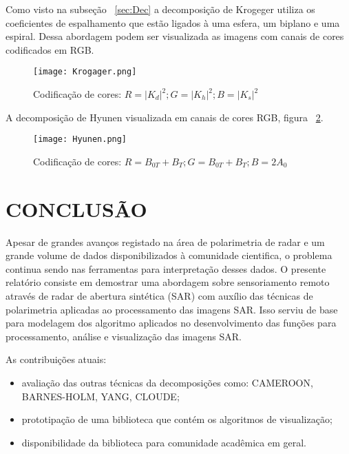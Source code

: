 \documentclass[a4paper,12pt]{article}
\begin{document}
Como visto na subseção ~\ref{sec:Dec} a decomposição de Krogeger utiliza os coeficientes de espalhamento que estão ligados à uma esfera, um biplano e uma espiral. Dessa abordagem podem ser visualizada as imagens com canais de cores codificados em RGB.

\begin{figure}[H]
	\centering
	\texttt{[image: Krogager.png]}
	\caption{Codificação de cores: $R=|K_{d}|^2; G=|K_{h}|^2; B=|K_{s}|^2$}
	\label{fig:Krogager}
\end{figure}

\newpage

A decomposição de Hyunen visualizada em canais de cores RGB, figura ~\ref{fig:Hyunen}.

\begin{figure}[H]
	\centering
	\texttt{[image: Hyunen.png]}
	\caption{Codificação de cores: $R=B_{0T}+B_{T}; G=B_{0T}+B_{T}; B=2A_{0}$}
	\label{fig:Hyunen}
\end{figure}

\newpage
\section{CONCLUSÃO}

Apesar de grandes avanços registado na área de polarimetria de radar e um grande volume de dados disponibilizados à comunidade cientifica, o problema continua sendo nas ferramentas para interpretação desses dados. O presente relatório consiste em demostrar uma abordagem sobre sensoriamento remoto através de radar de abertura sintética (SAR) com auxílio das técnicas de polarimetria aplicadas ao processamento das imagens SAR. Isso serviu de base para modelagem dos algoritmo aplicados no desenvolvimento das funções para processamento, análise e visualização das imagens SAR.

As contribuições atuais: 

\begin{itemize}
    \item avaliação das outras técnicas da decomposições como:  CAMEROON, BARNES-HOLM, YANG, CLOUDE;
    \item prototipação de uma biblioteca que contém os algoritmos de visualização;
    \item disponibilidade da biblioteca para comunidade acadêmica em geral.  
\end{itemize}

\newpage


\end{document}
